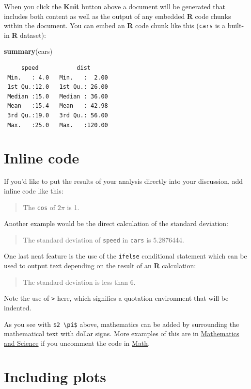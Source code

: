 \documentclass[12pt,twoside]{reedthesis}
\newenvironment{Shaded}{\begin{snugshade}}{\end{snugshade}}
\newcommand{\KeywordTok}[1]{\textcolor[rgb]{0.13,0.29,0.53}{\textbf{#1}}}
\newcommand{\NormalTok}[1]{#1}
\theoremstyle{definition}
\theoremstyle{definition}
\theoremstyle{definition}
\theoremstyle{remark}
\begin{document}
When you click the \textbf{Knit} button above a document will be
generated that includes both content as well as the output of any
embedded \textbf{R} code chunks within the document. You can embed an
\textbf{R} code chunk like this (\texttt{cars} is a built-in \textbf{R}
dataset):
\begin{Shaded}
\begin{Highlighting}[]
\KeywordTok{summary}\NormalTok{(cars)}
\end{Highlighting}
\end{Shaded}
\begin{verbatim}
     speed           dist       
 Min.   : 4.0   Min.   :  2.00  
 1st Qu.:12.0   1st Qu.: 26.00  
 Median :15.0   Median : 36.00  
 Mean   :15.4   Mean   : 42.98  
 3rd Qu.:19.0   3rd Qu.: 56.00  
 Max.   :25.0   Max.   :120.00  
\end{verbatim}
\section{Inline code}\label{inline-code}

If you'd like to put the results of your analysis directly into your
discussion, add inline code like this:
\begin{quote}
The \texttt{cos} of \(2 \pi\) is 1.
\end{quote}
Another example would be the direct calculation of the standard
deviation:
\begin{quote}
The standard deviation of \texttt{speed} in \texttt{cars} is 5.2876444.
\end{quote}
One last neat feature is the use of the \texttt{ifelse} conditional
statement which can be used to output text depending on the result of an
\textbf{R} calculation:
\begin{quote}
The standard deviation is less than 6.
\end{quote}
Note the use of \texttt{\textgreater{}} here, which signifies a
quotation environment that will be indented.

As you see with \texttt{\$2\ \textbackslash{}pi\$} above, mathematics
can be added by surrounding the mathematical text with dollar signs.
More examples of this are in \protect\hyperlink{math-sci}{Mathematics
and Science} if you uncomment the code in
\protect\hyperlink{math}{Math}.

\section{Including plots}\label{including-plots}
\end{document}
